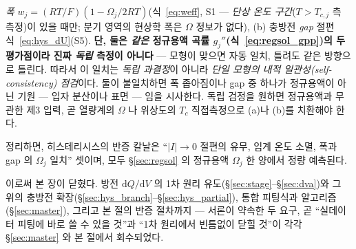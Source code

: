 \documentclass[11pt,a4paper]{article}
\newcommand{\dd}{\mathrm{d}}
\begin{document}
\begin{enumerate}[label=(\roman*),leftmargin=2.0em,itemsep=2pt]
  \emph{폭} $w_j=(RT/F)(1-\Omega_j/2RT)$(식~\eqref{eq:weff}, S1 — \emph{단상 온도 구간}($T>T_{c,j}$ 측 측정)이 있을
  때만; 분기 영역의 현상학 폭은 $\Omega$ 정보가 없다), (b) 충방전 \emph{gap} 절편 식~\eqref{eq:hys_dU}(S5).
  \textbf{단, 둘은 \emph{같은} 정규용액 곡률 $g_j''$(식~\eqref{eq:regsol_gpp})의 두 평가점이라 진짜 \emph{독립} 측정이
  아니다} — 모형이 맞으면 자동 일치, 틀려도 같은 방향으로 틀린다. 따라서 이 일치는 \emph{독립 과결정}이 아니라
  \emph{단일 모형의 내적 일관성(self-consistency) 점검}이다. 둘이 불일치하면 폭 좁아짐이나 gap 중 하나가
  정규용액이 아닌 기원 — 입자 분산이나 표면 — 임을 시사한다. 독립 검정을 원하면 정규용액과 무관한 제3 입력,
  곧 열량계의 $\Omega$ 나 위상도의 $T_c$ 직접측정으로 (a)나 (b)를 치환해야 한다.
\end{enumerate}
정리하면, 히스테리시스의 반증 칼날은 ``$|I|\to0$ 절편의 유무, 임계 온도 소멸, 폭과 gap 의 $\Omega_j$
일치'' 셋이며, 모두 \S\ref{sec:regsol} 의 정규용액 $\Omega_j$ 한 양에서 정량 예측된다.

\medskip
이로써 본 장이 닫혔다. 방전 $\dd Q/\dd V$ 의 1차 원리 유도(\S\ref{sec:stage}--\S\ref{sec:dva})와 그 위의
충방전 확장(\S\ref{sec:hys_branch}--\S\ref{sec:hys_partial}), 통합 피팅식과 알고리즘(\S\ref{sec:master}),
그리고 본 절의 반증 절차까지 — 서론이 약속한 두 요구, 곧 ``실데이터 피팅에 바로 쓸 수 있을 것''과 ``1차
원리에서 빈틈없이 닫힐 것''이 각각 \S\ref{sec:master} 와 본 절에서 회수되었다.

\end{document}
